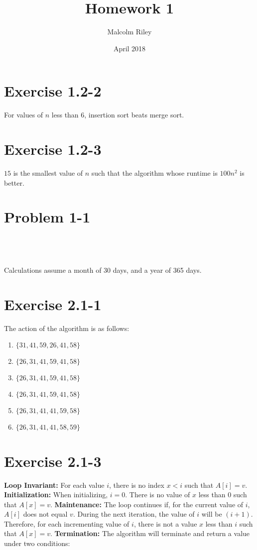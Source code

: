\documentclass[11pt]{article}
\title{\textbf{Homework 1}}
\author{Malcolm Riley}
\date{April 2018}
\begin{document}
\maketitle
{}

\section*{Exercise 1.2-2}
For values of $n$ less than $6$, insertion sort beats merge sort.

\section*{Exercise 1.2-3}
$15$ is the smallest value of $n$ such that the algorithm whose runtime is $100n^2$ is better.

\section*{Problem 1-1}
 \\ \\
 \\
Calculations assume a month of 30 days, and a year of 365 days.

\section*{Exercise 2.1-1}
The action of the algorithm is as follows:
\begin{enumerate}
\item { $ \{31,41,59,26,41,58\} $ }
\item { $ \{26,31,41,59,41,58\} $ }
\item { $ \{26,31,41,59,41,58\} $ }
\item { $ \{26,31,41,59,41,58\} $ }
\item { $ \{26,31,41,41,59,58\} $ }
\item { $ \{26,31,41,41,58,59\} $ }
\end{enumerate}

\section*{Exercise 2.1-3}


\textbf{Loop Invariant:} For each value $i$, there is no index $x < i$ such that $A[i] = v$.
\textbf{Initialization:} When initializing, $i = 0$. There is no value of $x$ less than $0$ such that $A[x] = v$.
\textbf{Maintenance:} The loop continues if, for the current value of $i$, $A[i]$ does not equal $v$. During the next iteration, the value of $i$ will be $(i+1)$. Therefore, for each incrementing value of $i$, there is not a value $x$ less than $i$ such that $A[x] = v$.
\textbf{Termination:} The algorithm will terminate and return a value under two conditions:
\end{document}
